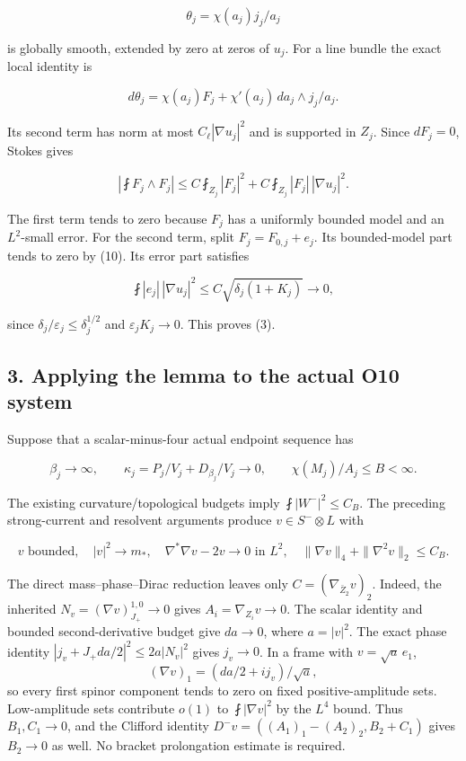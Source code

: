 \documentclass[11pt]{article}
\begin{document}
\[
 \theta_j=\chi(a_j)j_j/a_j
\]

is globally smooth, extended by zero at zeros of \(u_j\). For a line
bundle the exact local identity is

\[
 d\theta_j=\chi(a_j)F_j+
 \chi'(a_j)\,da_j\wedge j_j/a_j.
\tag{11}
\]

Its second term has norm at most \(C_\ell|\nabla u_j|^2\) and is
supported in \(Z_j\). Since \(dF_j=0\), Stokes gives

\[
 \left|\fint F_j\wedge F_j\right|
 \le C\fint_{Z_j}|F_j|^2+
 C\fint_{Z_j}|F_j|\,|\nabla u_j|^2.
\tag{12}
\]

The first term tends to zero because \(F_j\) has a uniformly bounded
model and an \(L^2\)-small error. For the second term, split
\(F_j=F_{0,j}+e_j\). Its bounded-model part tends to zero by (10). Its
error part satisfies

\[
 \fint|e_j|\,|\nabla u_j|^2
 \le C\sqrt{\delta_j(1+K_j)}\longrightarrow0,
\tag{13}
\]

since \(\delta_j/\varepsilon_j\le\delta_j^{1/2}\) and
\(\varepsilon_jK_j\to0\). This proves (3).

\hypertarget{applying-the-lemma-to-the-actual-o10-system}{%
\subsection{3. Applying the lemma to the actual O10
system}\label{applying-the-lemma-to-the-actual-o10-system}}

Suppose that a scalar-minus-four actual endpoint sequence has

\[
 \beta_j\to\infty,\qquad
 \kappa_j=P_j/V_j+D_{\beta_j}/V_j\to0,
 \qquad \chi(M_j)/A_j\le B<\infty.
\tag{14}
\]

The existing curvature/topological budgets imply
\(\fint|W^-|^2\le C_B\). The preceding strong-current and resolvent
arguments produce \(v\in S^-\otimes L\) with

\[
 v\text{ bounded},\quad |v|^2\to m_*,\quad
 \nabla^*\nabla v-2v\to0\text{ in }L^2,
 \quad \|\nabla v\|_4+\|\nabla^2v\|_2\le C_B.
\]

The direct mass--phase--Dirac reduction leaves only
\(C=(\nabla_{\bar Z_2}v)_2\). Indeed, the inherited
\(N_v=(\nabla v)^{1,0}_{J_+}\to0\) gives \(A_i=\nabla_{Z_i}v\to0\). The
scalar identity and bounded second-derivative budget give \(da\to0\),
where \(a=|v|^2\). The exact phase identity
\(|j_v+J_+da/2|^2\le2a|N_v|^2\) gives \(j_v\to0\). In a frame with
\(v=\sqrt a\,e_1\), \[
 (\nabla v)_1=(da/2+i j_v)/\sqrt a,
\] so every first spinor component tends to zero on fixed
positive-amplitude sets. Low-amplitude sets contribute \(o(1)\) to
\(\fint|\nabla v|^2\) by the \(L^4\) bound. Thus \(B_1,C_1\to0\), and
the Clifford identity \(D^-v=((A_1)_1-(A_2)_2,B_2+C_1)\) gives
\(B_2\to0\) as well. No bracket prolongation estimate is required.
\end{document}
